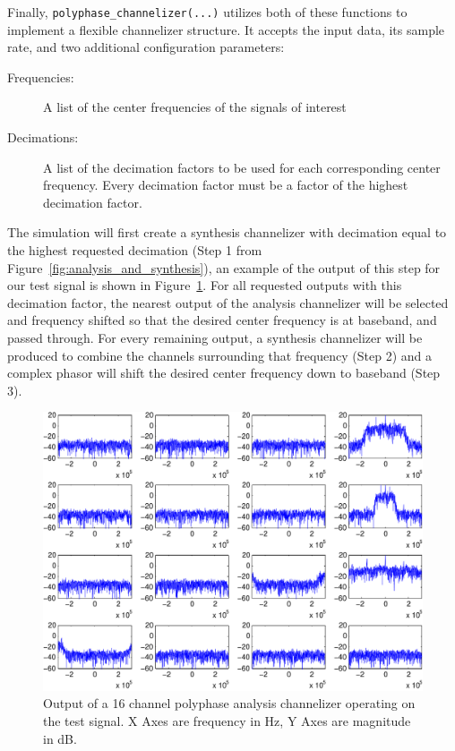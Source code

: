 \documentclass[12pt]{article}
\begin{document}
Finally, \texttt{polyphase\_channelizer(...)} utilizes both of these functions to
implement a flexible channelizer structure.  It accepts the input data, its
sample rate, and two additional configuration parameters:
\begin{description}
    \item[Frequencies:] A list of the center frequencies of the signals of interest
    \item[Decimations:] A list of the decimation factors to be used for each
        corresponding center frequency.  Every decimation factor must be
        a factor of the highest decimation factor.
\end{description}
The simulation will first create a synthesis channelizer with decimation equal
to the highest requested decimation (Step 1 from
Figure~\ref{fig:analysis_and_synthesis}), an example of the output of this step
for our test signal is shown in Figure~\ref{fig:polyphase_splits}.  For all
requested outputs with this decimation factor, the nearest output of the
analysis channelizer will be selected and frequency shifted so that the
desired center frequency is at baseband, and passed through. For every
remaining output, a synthesis channelizer will be produced to combine the
channels surrounding that frequency (Step 2) and a complex phasor will shift
the desired center frequency down to baseband (Step 3).

\begin{figure}[ht!]
    \includegraphics[width=\textwidth]{polyphase_splits}%
    \caption{Output of a 16 channel polyphase analysis channelizer operating on
             the test signal. X Axes are frequency in Hz, Y Axes are magnitude
             in dB.}
    \label{fig:polyphase_splits}
\end{figure}
\end{document}
